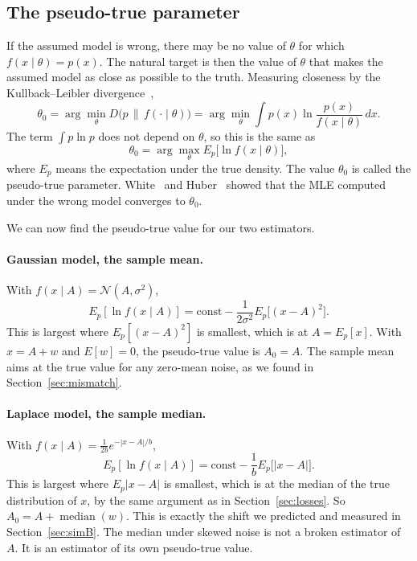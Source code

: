 \documentclass[11pt]{article}
\numberwithin{figure}{section}
\numberwithin{equation}{section}
\begin{document}
\subsection{The pseudo-true parameter}

If the assumed model is wrong, there may be no value of $\theta$ for which $f(x\mid\theta) = p(x)$. The
natural target is then the value of $\theta$ that makes the assumed model as close as possible to
the truth. Measuring closeness by the Kullback--Leibler divergence~\cite[assumption A1]{fortunati},
\[
  \theta_0 = \arg\min_{\theta} D\big(p \,\|\, f(\cdot \mid \theta)\big)
  = \arg\min_{\theta} \int p(x)\ln\frac{p(x)}{f(x\mid\theta)}\,dx .
\]
The term $\int p \ln p$ does not depend on $\theta$, so this is the same as
\[
  \theta_0 = \arg\max_{\theta} E_p\big[\ln f(x \mid \theta)\big],
\]
where $E_p$ means the expectation under the true density. The value $\theta_0$ is called the
pseudo-true parameter. White~\cite{white} and Huber~\cite{huber67} showed that the MLE computed
under the wrong model converges to $\theta_0$.

We can now find the pseudo-true value for our two estimators.

\paragraph{Gaussian model, the sample mean.} With $f(x\mid A) = \mathcal{N}(A, \sigma^2)$,
\[
  E_p[\ln f(x\mid A)] = \text{const} - \frac{1}{2\sigma^2}E_p\big[(x - A)^2\big].
\]
This is largest where $E_p[(x-A)^2]$ is smallest, which is at $A = E_p[x]$. With $x = A + w$ and
$E[w] = 0$, the pseudo-true value is $A_0 = A$. The sample mean aims at the true value for any
zero-mean noise, as we found in Section~\ref{sec:mismatch}.

\paragraph{Laplace model, the sample median.} With $f(x\mid A) = \frac{1}{2b}e^{-|x - A|/b}$,
\[
  E_p[\ln f(x\mid A)] = \text{const} - \frac{1}{b}E_p\big[|x - A|\big].
\]
This is largest where $E_p|x - A|$ is smallest, which is at the median of the true distribution of
$x$, by the same argument as in Section~\ref{sec:losses}. So $A_0 = A + \operatorname{median}(w)$.
This is exactly the shift we predicted and measured in Section~\ref{sec:simB}. The median under
skewed noise is not a broken estimator of $A$. It is an estimator of its own pseudo-true value.
\end{document}
